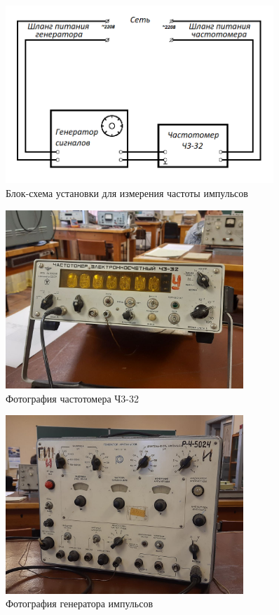 \begin{figure}[ht!]
\centering
\includegraphics[width=0.9\textwidth]{Scheme.png}
\caption{Блок-схема установки для измерения частоты импульсов}
\label{fig:Scheme}
\end{figure}

\begin{figure}[ht!]
\centering
\includegraphics[width=0.8\textwidth]{photo1.jpg}
\caption{Фотография частотомера Ч3-32}
\label{fig:photo1}
\end{figure}

\begin{figure}[ht!]
\centering
\includegraphics[width=0.8\textwidth]{photo2.jpg}
\caption{Фотография генератора импульсов}
\label{fig:photo2}
\end{figure}

